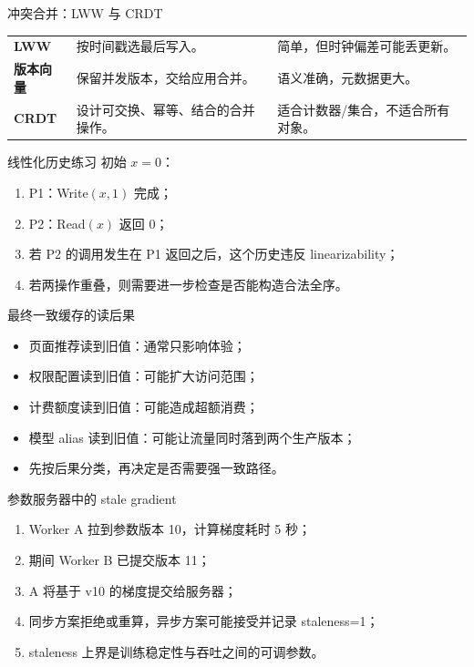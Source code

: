 \documentclass[UTF8,fontset=none,aspectratio=169,10pt]{beamer}
\begin{document}
\begin{frame}{冲突合并：LWW 与 CRDT}
\begin{tabularx}{\linewidth}{>{\bfseries}p{3cm}XX}
\toprule
LWW & 按时间戳选最后写入。 & 简单，但时钟偏差可能丢更新。 \\
版本向量 & 保留并发版本，交给应用合并。 & 语义准确，元数据更大。 \\
CRDT & 设计可交换、幂等、结合的合并操作。 & 适合计数器/集合，不适合所有对象。 \\
\bottomrule
\end{tabularx}
\end{frame}

\begin{frame}{线性化历史练习}
初始 $x=0$：
\begin{enumerate}
  \item P1：Write$(x,1)$ 完成；
  \item P2：Read$(x)$ 返回 0；
  \item 若 P2 的调用发生在 P1 返回之后，这个历史违反 linearizability；
  \item 若两操作重叠，则需要进一步检查是否能构造合法全序。
\end{enumerate}
\end{frame}

\begin{frame}{最终一致缓存的读后果}
\begin{itemize}
  \item 页面推荐读到旧值：通常只影响体验；
  \item 权限配置读到旧值：可能扩大访问范围；
  \item 计费额度读到旧值：可能造成超额消费；
  \item 模型 alias 读到旧值：可能让流量同时落到两个生产版本；
  \item 先按后果分类，再决定是否需要强一致路径。
\end{itemize}
\end{frame}

\begin{frame}{参数服务器中的 stale gradient}
\begin{enumerate}
  \item Worker A 拉到参数版本 10，计算梯度耗时 5 秒；
  \item 期间 Worker B 已提交版本 11；
  \item A 将基于 v10 的梯度提交给服务器；
  \item 同步方案拒绝或重算，异步方案可能接受并记录 staleness=1；
  \item staleness 上界是训练稳定性与吞吐之间的可调参数。
\end{enumerate}
\end{frame}
\end{document}
